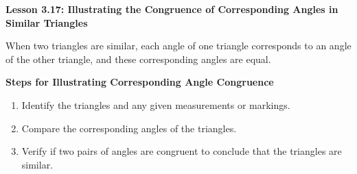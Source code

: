 \begin{center}
\textbf{Lesson 3.17: Illustrating the Congruence of Corresponding Angles in Similar Triangles}
\end{center}

\vspace*{-1.5ex}

When two triangles are similar, each angle of one triangle corresponds to an angle of the other triangle, and these corresponding angles are equal.

\noindent\textbf{Steps for Illustrating Corresponding Angle Congruence}
\begin{enumerate}
    \item Identify the triangles and any given measurements or markings.
    \item Compare the corresponding angles of the triangles.
    \item Verify if two pairs of angles are congruent to conclude that the triangles are similar.
 
\end{enumerate}
